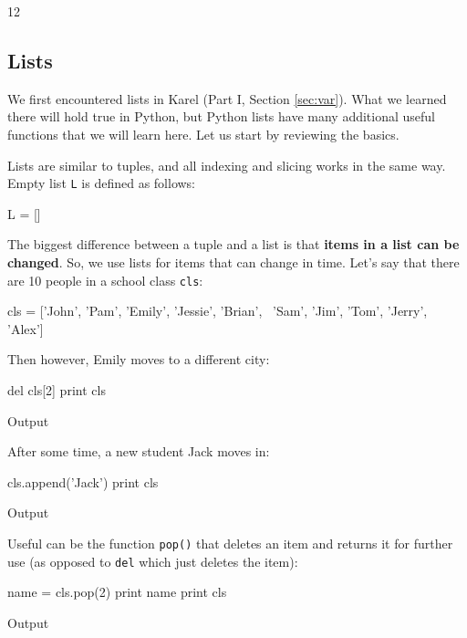 \begin{greencode}
12
\end{greencode}

\subsection{Lists}

We first encountered lists in Karel (Part I, Section \ref{sec:var}). What we
learned there will hold true in Python, but Python lists have many additional 
useful functions that we will learn here. Let us start by reviewing the basics.
  
Lists are similar to tuples, and all indexing and slicing works in the same way. 
Empty list {\tt L} is defined as follows:

\begin{bluecode}
L = []
\end{bluecode}
The biggest difference between a tuple 
and a list is that {\bf items in a list can be changed}. So, we use
lists for items that can change in time. Let's say that there are 
10 people in a school class {\tt cls}:

\begin{bluecode}
cls = ['John', 'Pam', 'Emily', 'Jessie', 'Brian', \
'Sam', 'Jim', 'Tom', 'Jerry', 'Alex']
\end{bluecode}
Then however, Emily moves to a different city:

\begin{bluecode}
del cls[2]
print cls
\end{bluecode}
Output

\begin{greencode}
\end{greencode}
After some time, a new student Jack moves in:

\begin{bluecode}
cls.append('Jack')
print cls
\end{bluecode}
Output

\begin{greencode}
\end{greencode}
Useful can be the function {\tt pop()} that deletes an item and returns it for further
use (as opposed to {\tt del} which just deletes the item):

\begin{bluecode}
name = cls.pop(2)
print name 
print cls
\end{bluecode}
Output

